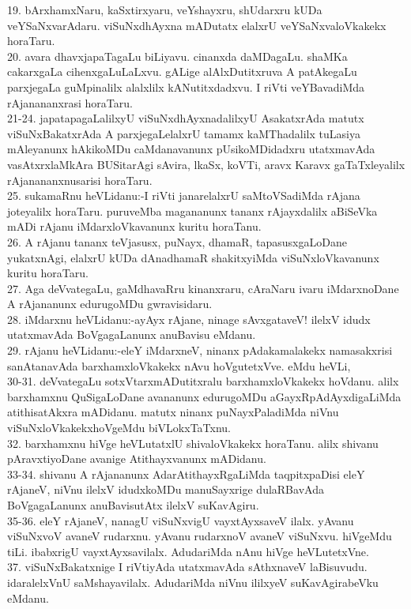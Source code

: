 \documentclass{article}
\begin{document}
19. bArxhamxNaru, kaSxtirxyaru, veYshayxru, shUdarxru kUDa veYSaNxvarAdaru. viSuNxdhAyxna mADutatx elalxrU veYSaNxvaloVkakekx horaTaru.\\
20. avara dhavxjapaTagaLu biLiyavu. cinanxda daMDagaLu. shaMKa cakarxgaLa cihenxgaLuLaLxvu. gALige alAlxDutitxruva A patAkegaLu parxjegaLa guMpinalilx alalxlilx kANutitxdadxvu. I riVti veYBavadiMda rAjanananxrasi horaTaru.\\
21-24. japatapagaLalilxyU viSuNxdhAyxnadalilxyU AsakatxrAda matutx viSuNxBakatxrAda A parxjegaLelalxrU tamamx kaMThadalilx tuLasiya mAleyanunx hAkikoMDu caMdanavanunx pUsikoMDidadxru utatxmavAda vasAtxrxlaMkAra BUSitarAgi sAvira, lkaSx, koVTi, aravx Karavx gaTaTxleyalilx rAjanananxnusarisi horaTaru.\\
25. sukamaRnu heVLidanu:-I riVti janarelalxrU saMtoVSadiMda rAjana joteyalilx horaTaru. puruveMba magananunx tananx rAjayxdalilx aBiSeVka mADi rAjanu iMdarxloVkavanunx kuritu horaTanu.\\
26. A rAjanu tananx teVjasusx, puNayx, dhamaR, tapasusxgaLoDane yukatxnAgi, elalxrU kUDa dAnadhamaR shakitxyiMda viSuNxloVkavanunx kuritu horaTaru.\\
27. Aga deVvategaLu, gaMdhavaRru kinanxraru, cAraNaru ivaru iMdarxnoDane A rAjananunx edurugoMDu gwravisidaru.\\
28. iMdarxnu heVLidanu:-ayAyx rAjane, ninage sAvxgataveV! ilelxV idudx utatxmavAda BoVgagaLanunx anuBavisu eMdanu.\\
29. rAjanu heVLidanu:-eleY iMdarxneV, ninanx pAdakamalakekx namasakxrisi sanAtanavAda barxhamxloVkakekx nAvu hoVgutetxVve. eMdu heVLi,\\
30-31. deVvategaLu sotxVtarxmADutitxralu barxhamxloVkakekx hoVdanu. alilx barxhamxnu QuSigaLoDane avananunx edurugoMDu aGayxRpAdAyxdigaLiMda atithisatAkxra mADidanu. matutx ninanx puNayxPaladiMda niVnu viSuNxloVkakekxhoVgeMdu biVLokxTaTxnu.\\
32. barxhamxnu hiVge heVLutatxlU shivaloVkakekx horaTanu. alilx shivanu pAravxtiyoDane avanige Atithayxvanunx mADidanu.\\
33-34. shivanu A rAjananunx AdarAtithayxRgaLiMda taqpitxpaDisi eleY rAjaneV, niVnu ilelxV idudxkoMDu manuSayxrige dulaRBavAda BoVgagaLanunx anuBavisutAtx ilelxV suKavAgiru.\\
35-36. eleY rAjaneV, nanagU viSuNxvigU vayxtAyxsaveV ilalx. yAvanu viSuNxvoV avaneV rudarxnu. yAvanu rudarxnoV avaneV viSuNxvu. hiVgeMdu tiLi. ibabxrigU vayxtAyxsavilalx. AdudariMda nAnu hiVge heVLutetxVne.\\
37. viSuNxBakatxnige I riVtiyAda utatxmavAda sAthxnaveV laBisuvudu. idaralelxVnU saMshayavilalx. AdudariMda niVnu ililxyeV suKavAgirabeVku eMdanu.\\
\end{document}
